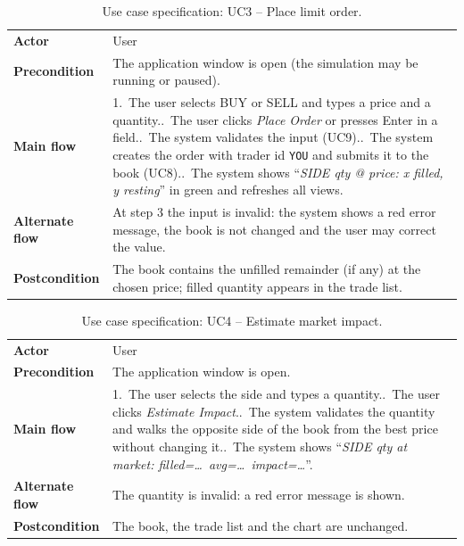 \documentclass[12pt,a4paper,openany,oneside]{report}
\newcommand{\code}[1]{\texttt{#1}}
\begin{document}
\begin{table}[H]
\centering\small
\caption{Use case specification: UC3 -- Place limit order.}
\begin{tabular}{@{}L{3.1cm} L{11.9cm}@{}}
\toprule
\textbf{Actor} & User\\
\textbf{Precondition} & The application window is open (the simulation may be running or paused).\\
\textbf{Main flow} & 1.~The user selects BUY or SELL and types a price and a quantity..~The user clicks \emph{Place Order} or presses Enter in a field..~The system validates the input (UC9)..~The system creates the order with trader id \code{YOU} and submits it to the book (UC8)..~The system shows ``\emph{SIDE qty @ price: x filled, y resting}'' in green and refreshes all views.\\
\textbf{Alternate flow} & At step 3 the input is invalid: the system shows a red error message, the book is not changed and the user may correct the value.\\
\textbf{Postcondition} & The book contains the unfilled remainder (if any) at the chosen price; filled quantity appears in the trade list.\\
\bottomrule
\end{tabular}
\end{table}

\begin{table}[H]
\centering\small
\caption{Use case specification: UC4 -- Estimate market impact.}
\begin{tabular}{@{}L{3.1cm} L{11.9cm}@{}}
\toprule
\textbf{Actor} & User\\
\textbf{Precondition} & The application window is open.\\
\textbf{Main flow} & 1.~The user selects the side and types a quantity..~The user clicks \emph{Estimate Impact}..~The system validates the quantity and walks the opposite side of the book from the best price without changing it..~The system shows ``\emph{SIDE qty at market: filled=\ldots\ avg=\ldots\ impact=\ldots}''.\\
\textbf{Alternate flow} & The quantity is invalid: a red error message is shown.\\
\textbf{Postcondition} & The book, the trade list and the chart are unchanged.\\
\bottomrule
\end{tabular}
\end{table}
\end{document}
